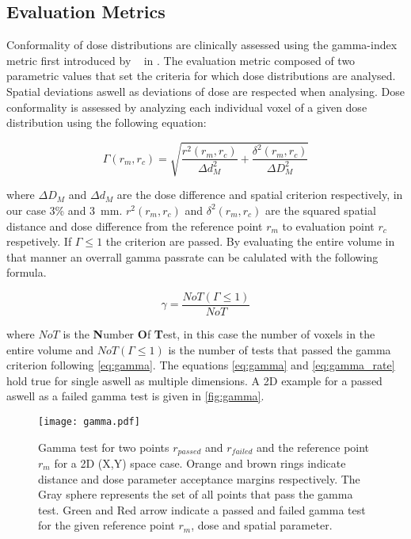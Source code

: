 \subsection{Evaluation Metrics}

Conformality of dose distributions are clinically assessed using the gamma-index metric first introduced by \citeauthor{low_technique_1998}~\cite{low_technique_1998} in \citeyear{low_technique_1998}. The evaluation metric composed of two parametric values that set the criteria for which dose distributions are analysed. Spatial deviations aswell as deviations of dose are respected when analysing. Dose conformality is assessed by analyzing each individual voxel of a given dose distribution using the following equation:

\begin{equation}\label{eq:gamma}
    \Gamma (r_m, r_c) = \sqrt{\frac{r^2(r_m,r_c)}{\Delta d^2_M} + \frac{\delta ^2(r_m,r_c)}{\Delta D^2_M}}
\end{equation}

where $\Delta D_M$ and $\Delta d_M$ are the dose difference and spatial criterion respectively, in our case 3\% and 3~mm.  $r^2(r_m,r_c)$ and $\delta ^2(r_m,r_c)$ are the squared spatial distance and dose difference from the reference point $r_m$ to evaluation point $r_c$ respetively. If $\Gamma \leq 1$ the criterion are passed. By evaluating the entire volume in that manner an overrall gamma passrate can be calulated with the following formula. 

\begin{equation}\label{eq:gamma_rate}
    \gamma = \frac{NoT(\Gamma \leq 1)}{NoT}
\end{equation}

where $NoT$ is the \textbf{N}umber \textbf{O}f \textbf{T}est, in this case the number of voxels in the entire volume and $NoT(\Gamma \leq 1)$ is the number of tests that passed the gamma criterion following \autoref{eq:gamma}. The equations \autoref{eq:gamma} and \autoref{eq:gamma_rate} hold true for single aswell as multiple dimensions. A 2D example for a passed aswell as a failed gamma test is given in \autoref{fig:gamma}. 

\begin{figure}
    \centering
    \texttt{[image: gamma.pdf]}
    \caption{Gamma test for two points $r_{passed}$ and $r_{failed}$ and the reference point $r_m$ for a 2D (X,Y) space case. Orange and brown rings indicate distance and dose parameter acceptance margins respectively. The Gray sphere represents the set of all points that pass the gamma test. Green and Red arrow indicate a passed and failed gamma test for the given reference point $r_m$, dose and spatial parameter.}\label{fig:gamma}
\end{figure}

